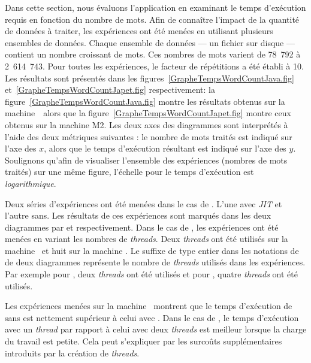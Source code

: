 Dans cette section, nous 
\'evaluons l'application  en examinant le temps d'ex\'ecution requis en fonction du nombre de mots. Afin de conna\^itre l'impact de la quantit\'e de donn\'ees \`a traiter, les exp\'eriences ont \'et\'e men\'ees en utilisant plusieurs ensembles de donn\'ees. Chaque ensemble de donn\'ees --- un fichier sur disque --- contient un nombre croissant de mots. Ces nombres de mots varient de 78~792 \`a 2~614~743. Pour toutes les exp\'eriences, le facteur de r\'ep\'etitions a \'et\'e \'etabli \`a 10.  Les r\'esultats sont pr\'esent\'es dans les figures~\ref{GrapheTempsWordCountJava.fig} et~\ref{GrapheTempsWordCountJapet.fig} respectivement: la figure~\ref{GrapheTempsWordCountJava.fig} montre les résultats obtenus sur la machine~\ alors que la figure~\ref{GrapheTempsWordCountJapet.fig} montre ceux obtenus sur la machine M2.  Les deux axes des diagrammes sont interpr\'et\'es \`a l'aide des deux m\'etriques suivantes : le nombre de mots trait\'es est indiqu\'e sur l'axe des $x$, alors que le temps d'ex\'ecution r\'esultant est indiqu\'e sur l'axe des $y$.  Soulignons qu'afin de visualiser l'ensemble des exp\'eriences (nombres de mots trait\'es) sur une m\^eme figure, l'\'echelle pour le temps d'ex\'ecution est \emph{logarithmique}. 

Deux s\'eries d'exp\'eriences ont \'et\'e men\'ees dans le cas de . L'une avec \emph{JIT} et l'autre sans. Les r\'esultats de ces exp\'eriences sont marqu\'es dans les deux diagrammes par  et  respectivement. Dans le cas de , les exp\'eriences ont \'et\'e men\'ees en variant les nombres de \emph{threads}. Deux \emph{threads} ont \'et\'e utilis\'es sur la machine \ et huit sur la machine . Le suffixe de type entier dans les notations de  de deux diagrammes repr\'esente le nombre de \emph{threads} utilis\'es dans les exp\'eriences. Par exemple pour , deux \emph{threads} ont \'et\'e utilis\'es et pour , quatre \emph{threads} ont \'et\'e utilis\'es.



Les exp\'eriences men\'ees sur la machine \ montrent que le temps d'ex\'ecution de  sans  est nettement sup\'erieur \`a celui avec . Dans le cas de , le temps d'ex\'ecution avec un \emph{thread} par rapport \`a celui avec deux \emph{threads} est meilleur lorsque la charge du travail est petite. Cela peut s'expliquer par les surco\^uts suppl\'ementaires introduits par la cr\'eation de \emph{threads}.

